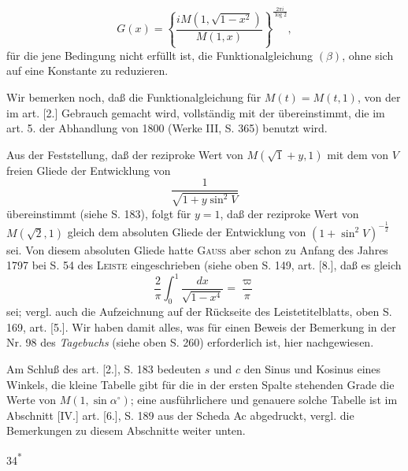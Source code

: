 \[G(x)=\left\{\frac{iM(1,\sqrt{1-x^2})}{M(1,x)}\right\}^{\frac{2\pi i}{\log2}},\]
\noindent für die jene Bedingung nicht erfüllt ist, die Funktionalgleichung $(\beta)$, ohne sich auf eine Konstante zu reduzieren.
\par\indent Wir bemerken noch, daß die Funktionalgleichung für $M(t)=M(t,1)$, von der im art. [2.] Gebrauch gemacht wird, vollständig mit der übereinstimmt, die im art. 5. der Abhandlung von 1800 (Werke III, S. 365) benutzt wird.
\par\indent Aus der Feststellung, daß der reziproke Wert von $M(\surd1+y,1)$ mit dem von $V$ freien Gliede der Entwicklung von
\[\frac1{\sqrt{1+y\sin^2 V}}\]
\noindent übereinstimmt (siehe S. 183), folgt für $y=1$, daß der reziproke Wert von $M(\surd2,1)$ gleich dem absoluten Gliede der Entwicklung von $(1+\sin^2 V)^{-\frac12}$ sei. Von diesem absoluten Gliede hatte \textsc{Gauss} aber schon zu Anfang des Jahres 1797 bei S. 54 des \textsc{Leiste} eingeschrieben (siehe oben S. 149, art. [8.], daß es gleich
\[\frac2\pi\int_0^1\frac{dx}{\sqrt{1-x^4}}=\frac\varpi\pi\]
\noindent sei; vergl. auch die Aufzeichnung auf der Rückseite des Leistetitelblatts, oben S. 169, art. [5.]. Wir haben damit alles, was für einen Beweis der Bemerkung in der Nr. 98 des \textit{Tagebuchs} (siehe oben S. 260) erforderlich ist, hier nachgewiesen.
\par\indent Am Schluß des art. [2.], S. 183 bedeuten $s$ und $c$ den Sinus und Kosinus eines Winkels, die kleine Tabelle gibt für die in der ersten Spalte stehenden Grade die Werte von $M(1,\sin\alpha^\circ)$; eine ausführlichere und genauere solche Tabelle ist im Abschnitt [IV.] art. [6.], S. 189 aus der Scheda Ac abgedruckt, vergl. die Bemerkungen zu diesem Abschnitte weiter unten.
\begin{flushright}34\textsuperscript{*}\end{flushright}
\clearpage
\endgroup

